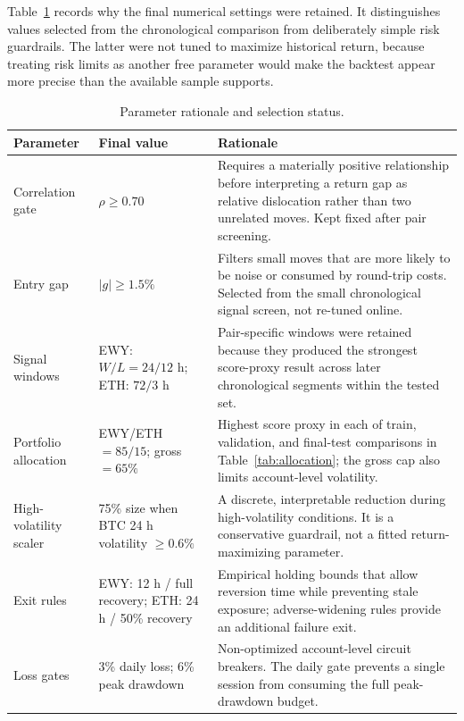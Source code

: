 \documentclass[a4paper,9pt]{article}
\begin{document}
Table~\ref{tab:parameters} records why the final numerical settings were
retained. It distinguishes values selected from the chronological comparison
from deliberately simple risk guardrails. The latter were not tuned to maximize
historical return, because treating risk limits as another free parameter would
make the backtest appear more precise than the available sample supports.

\begin{table}[h]\centering\small
\caption{Parameter rationale and selection status.}
\label{tab:parameters}
\begin{tabular}{p{2.9cm}p{2.3cm}p{4.4cm}}\toprule
Parameter & Final value & Rationale \\ \midrule
Correlation gate & $\rho\geq0.70$ & Requires a materially positive relationship before interpreting a return gap as relative dislocation rather than two unrelated moves. Kept fixed after pair screening. \\
Entry gap & $|g|\geq1.5\%$ & Filters small moves that are more likely to be noise or consumed by round-trip costs. Selected from the small chronological signal screen, not re-tuned online. \\
Signal windows & EWY: $W/L=24/12$ h; ETH: $72/3$ h & Pair-specific windows were retained because they produced the strongest score-proxy result across later chronological segments within the tested set. \\
Portfolio allocation & EWY/ETH $=85/15$; gross $=65\%$ & Highest score proxy in each of train, validation, and final-test comparisons in Table~\ref{tab:allocation}; the gross cap also limits account-level volatility. \\
High-volatility scaler & 75\% size when BTC 24 h volatility $\geq0.6\%$ & A discrete, interpretable reduction during high-volatility conditions. It is a conservative guardrail, not a fitted return-maximizing parameter. \\
Exit rules & EWY: 12 h / full recovery; ETH: 24 h / 50\% recovery & Empirical holding bounds that allow reversion time while preventing stale exposure; adverse-widening rules provide an additional failure exit. \\
Loss gates & 3\% daily loss; 6\% peak drawdown & Non-optimized account-level circuit breakers. The daily gate prevents a single session from consuming the full peak-drawdown budget. \\
\bottomrule\end{tabular}\end{table}
\end{document}
